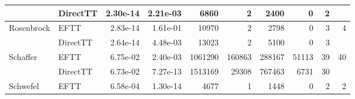 \begin{table}[!ht]
{\begin{tabular}{llrrrrrrrr}
                                           & DirectTT                        & 2.30e-14                    & 2.21e-03                                           & 6860                           & 2                                                   & 2400                          & 0                                                & 2                                        & {}                                       \\ \hline
            \multirow{2}{*}{Rosenbrock}    & EFTT                            & 2.83e-14                    & 1.61e-01                                           & 10970                          & 2                                                   & 2798                          & 0                                                & 3                                        & {4}                                      \\ %
                                           & DirectTT                        & 2.64e-14                    & 4.48e-03                                           & 13023                          & 2                                                   & 5100                          & 0                                                & 3                                        & {}                                       \\ \hline
            \multirow{2}{*}{Schaffer}      & EFTT                            & 6.75e-02                    & 2.40e-03                                           & 1061290                        & 160863                                              & 288167                        & 51113                                            & 39                                       & {40}                                     \\ %
                                           & DirectTT                        & 6.73e-02                    & 7.27e-13                                           & 1513169                        & 29308                                               & 767463                        & 6731                                             & 30                                       & {}                                       \\ \hline
            \multirow{2}{*}{Schwefel}      & EFTT                            & 6.58e-04                    & 1.30e-14                                           & 4677                           & 1                                                   & 1448                          & 0                                                & 2                                        & {2}                                      \\ %

\end{tabular}}
\end{table}
